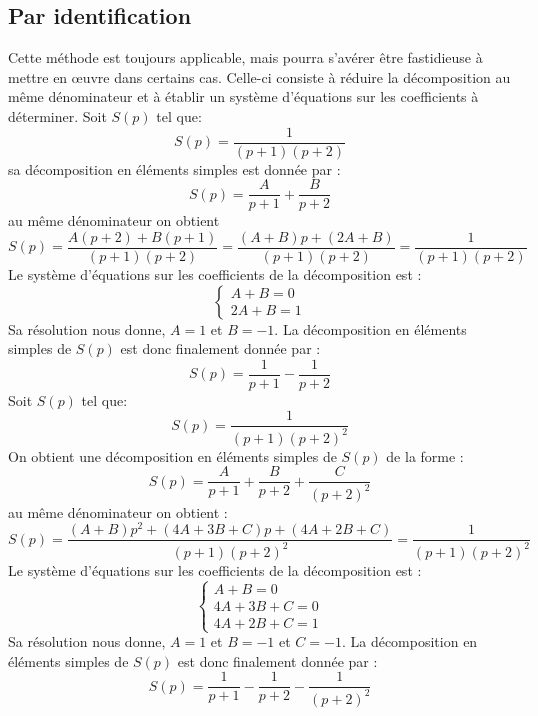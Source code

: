 \subsection{Par identification}
Cette méthode est toujours applicable, mais pourra s'avérer être fastidieuse
à mettre en œuvre dans certains cas.
Celle-ci consiste à réduire la décomposition au même dénominateur et à établir
un système d'équations sur les coefficients à déterminer.
\setcounter{exemple}{0}
\exemple
Soit $S(p)$ tel que:
\[
S(p)=\dfrac{1}{(p+1)(p+2)}
\]
sa décomposition en éléments simples est donnée par :
\[
S(p)=\dfrac{A}{p+1}+\dfrac{B}{p+2}
\]
au même dénominateur on obtient
\[
S(p)=\dfrac{A(p+2)+B(p+1)}{(p+1)(p+2)}
    =\dfrac{(A+B)p+(2A+B)}{(p+1)(p+2)}
    =\dfrac{1}{(p+1)(p+2)}
\]
Le système d'équations sur les coefficients de la décomposition est :
\[
\begin{cases}
    A+B=0\\
    2A+B=1
\end{cases}
\]
Sa résolution nous donne, $A=1$ et $B=-1$.
La décomposition en éléments simples de $S(p)$ est donc finalement donnée 
par :
\[
S(p)=\dfrac{1}{p+1}-\dfrac{1}{p+2}
\]
\exemple
Soit $S(p)$ tel que:
\[
S(p)=\dfrac{1}{(p+1)(p+2)^2}
\]
On obtient une décomposition en éléments simples de $S(p)$ de la forme :
\[
    S(p)=\dfrac{A}{p+1}+\dfrac{B}{p+2}+\dfrac{C}{(p+2)^2}
\]
au même dénominateur on obtient :
\[
    S(p)=\dfrac{(A+B)p^2+(4A+3B+C)p+(4A+2B+C)}{(p+1)(p+2)^2}
        =\dfrac{1}{(p+1)(p+2)^2}
\]
Le système d'équations sur les coefficients de la décomposition est :
\[
\begin{cases}
    A+B=0\\
    4A+3B+C=0\\
    4A+2B+C=1
\end{cases}
\]
Sa résolution nous donne, $A=1$ et $B=-1$ et $C=-1$.
La décomposition en éléments simples de $S(p)$ est donc finalement donnée 
par :
\[
    S(p)=\dfrac{1}{p+1}-\dfrac{1}{p+2}-\dfrac{1}{(p+2)^2}
\]
